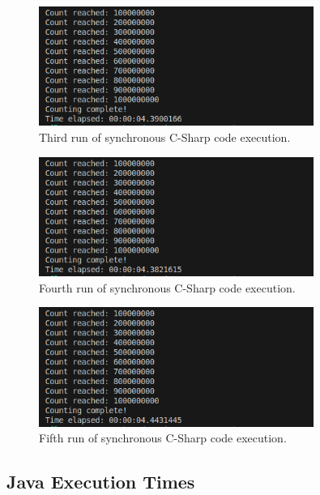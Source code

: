 \documentclass{article}
\begin{document}
\begin{figure}[htbp]
    \centering
    \includegraphics[width=0.8\textwidth]{../records/results_cs/result_3.png}
    \caption{Third run of synchronous C-Sharp code execution.}
    \label{fig:C-Sharp-runtime-3}
\end{figure}

\begin{figure}[htbp]
    \centering
    \includegraphics[width=0.8\textwidth]{../records/results_cs/result_4.png}
    \caption{Fourth run of synchronous C-Sharp code execution.}
    \label{fig:C-Sharp-runtime-4}
\end{figure}

\begin{figure}[htbp]
    \centering
    \includegraphics[width=0.8\textwidth]{../records/results_cs/result_5.png}
    \caption{Fifth run of synchronous C-Sharp code execution.}
    \label{fig:C-Sharp-runtime-5}
\end{figure}

\clearpage
\subsection{Java Execution Times} 
\end{document}

